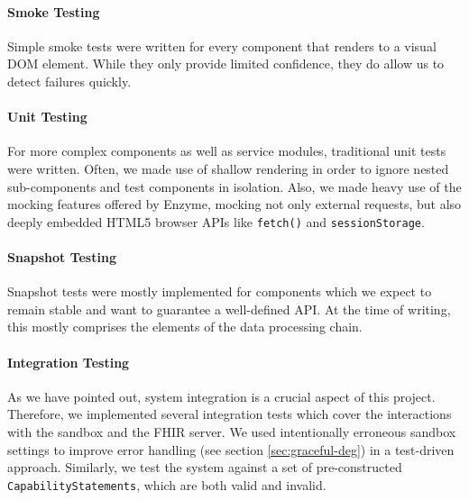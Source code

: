 \documentclass[sigconf]{acmart}
\begin{document}
\paragraph{Smoke Testing}

Simple smoke tests were written for every component that renders to a visual DOM element. %
While they only provide limited confidence, they do allow us to detect failures quickly.


\paragraph{Unit Testing}

For more complex components as well as service modules, traditional unit tests were written. Often, we made use of shallow rendering in order to ignore nested sub-components and test components in isolation. Also, we made heavy use of the mocking features offered by Enzyme, mocking not only external requests, but also deeply embedded HTML5 browser APIs like \texttt{fetch()} and \texttt{sessionStorage}.%


\paragraph{Snapshot Testing}

Snapshot tests were mostly implemented for components which we expect to remain stable and want to guarantee a well-defined API. At the time of writing, this mostly comprises the elements of the data processing chain.%


\paragraph{Integration Testing}

As we have pointed out, system integration is a crucial aspect of this project. Therefore, we implemented several integration tests which cover the interactions with the sandbox and the FHIR server. %
We used intentionally erroneous sandbox settings to improve error handling (see section \ref{sec:graceful-deg}) in a test-driven approach. Similarly, we test the system against a set of pre-constructed \texttt{CapabilityStatements}, which are both valid and invalid.
\end{document}
